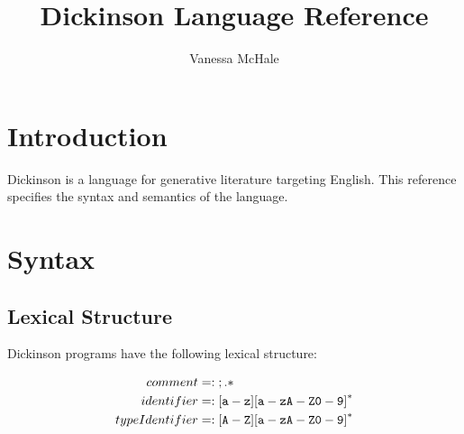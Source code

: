 \documentclass{book}
\begin{document}
\title{Dickinson Language Reference}
\author {Vanessa McHale}
\maketitle

\tableofcontents

\section{Introduction}

Dickinson is a language for generative literature targeting English. This reference specifies the syntax and semantics of the language.

\section{Syntax}

\subsection{Lexical Structure}

Dickinson programs have the following lexical structure:

\begin{align*}
    comment &=: {\tt ; .*} \\
    identifier &=: {\tt [a-z][a-zA-Z0-9]}^* \\
    typeIdentifier &=: {\tt [A-Z][a-zA-Z0-9]}^*
\end{align*}
\end{document}
